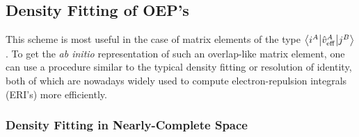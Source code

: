 \subsection{\label{ss:2.3.oep-GDF}Density Fitting of OEP's}

This scheme is most useful in the case of matrix elements of the type
$
 \bigl\langle {i^A} \bigl\lvert {\hat{v}_{\rm eff}^A} \bigl\lvert {j^B} \bigr\rangle
$.
To get the \emph{ab initio} representation of such an overlap\hyp{}like matrix element,
one can use a procedure similar to
the typical density fitting or resolution of identity, both of which are nowadays widely used 
to compute electron\hyp{}repulsion integrals (ERI's) more efficiently. 

\subsubsection{\label{sss:2.3.1.GDF-1}Density Fitting in Nearly-Complete Space}


